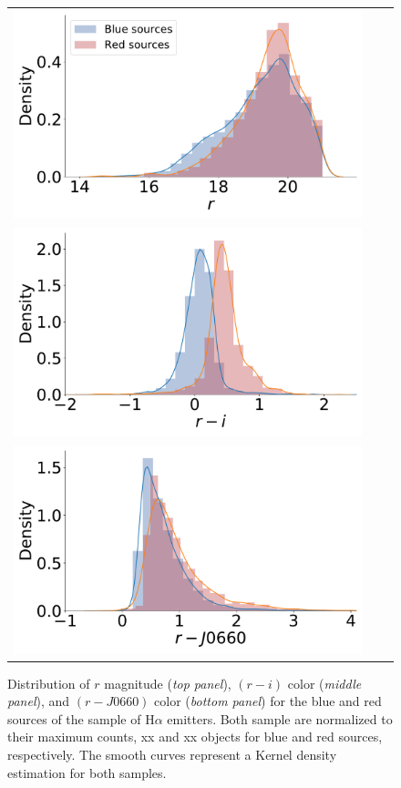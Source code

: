 \documentclass[fleqn,usenatbib]{mnras}
\begin{document}
\begin{figure}
  \begin{tabular}{l l l}
  \includegraphics[width=\columnwidth]{Figs/distribution_r-group.pdf} \\
    \includegraphics[width=\columnwidth]{Figs/distribution-ri-group.pdf}\\
    \includegraphics[width=\columnwidth]{Figs/distribution-Halpha-group.pdf}
  \end{tabular}
  \caption{Distribution of $r$ magnitude  (\textit{top panel}), $(r - i)$ color (\textit{middle panel}), and $(r - J0660)$
    color (\textit{bottom panel}) for the blue and red sources of the sample of H$\alpha$ emitters.
    Both sample are normalized to their maximum counts, xx and xx objects for blue and
    red sources, respectively. The smooth curves represent a Kernel density estimation for both samples.}
    \label{fig:diagram-distri}
\end{figure}
\end{document}
